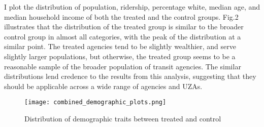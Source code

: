 \documentclass [12pt]{report}
\begin{document}
\begin{table}[H] 
\tiny
\centering \renewcommand*{\arraystretch}{1.1}\caption{Summary statistics of ACS variables}
\end{table}

\indent I plot the distribution of population, ridership, percentage white, median age, and median household income of both the treated and the control groups. Fig.2 illustrates that the distribution of the treated group is similar to the broader control group in almost all categories, with the peak of the distribution at a similar point. The treated agencies tend to be slightly wealthier, and serve slightly larger populations, but otherwise, the treated group seems to be a reasonable sample of the broader population of transit agencies. The similar distributions lend credence to the results from this analysis, suggesting that they should be applicable across a wide range of agencies and UZAs.
\begin{figure}[H]
    \centering
    \texttt{[image: combined\_demographic\_plots.png]} %
    \caption{Distribution of demographic traits between treated and control}
\end{figure}

\end{document}
